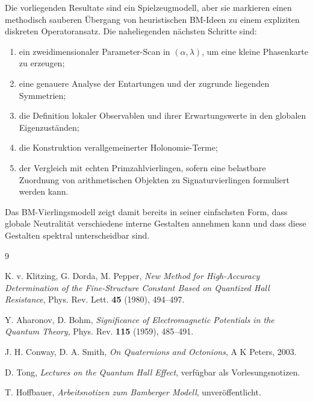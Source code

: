 \documentclass[11pt,a4paper]{article}
\begin{document}
	Die vorliegenden Resultate sind ein Spielzeugmodell, aber sie markieren einen methodisch sauberen Übergang von heuristischen BM-Ideen zu einem expliziten diskreten Operatoransatz. Die naheliegenden nächsten Schritte sind:
	
	\begin{enumerate}[label=(\arabic*)]
		\item ein zweidimensionaler Parameter-Scan in \((\alpha,\lambda)\), um eine kleine Phasenkarte zu erzeugen;
		\item eine genauere Analyse der Entartungen und der zugrunde liegenden Symmetrien;
		\item die Definition lokaler Observablen und ihrer Erwartungswerte in den globalen Eigenzuständen;
		\item die Konstruktion verallgemeinerter Holonomie-Terme;
		\item der Vergleich mit echten Primzahlvierlingen, sofern eine belastbare Zuordnung von arithmetischen Objekten zu Signaturvierlingen formuliert werden kann.
	\end{enumerate}
	
	Das BM-Vierlingsmodell zeigt damit bereits in seiner einfachsten Form, dass globale Neutralität verschiedene interne Gestalten annehmen kann und dass diese Gestalten spektral unterscheidbar sind.
	
	\begin{thebibliography}{9}
		
		K. v. Klitzing, G. Dorda, M. Pepper,
		\textit{New Method for High-Accuracy Determination of the Fine-Structure Constant Based on Quantized Hall Resistance},
		Phys. Rev. Lett. \textbf{45} (1980), 494--497.
		
		Y. Aharonov, D. Bohm,
		\textit{Significance of Electromagnetic Potentials in the Quantum Theory},
		Phys. Rev. \textbf{115} (1959), 485--491.
		
		J. H. Conway, D. A. Smith,
		\textit{On Quaternions and Octonions},
		A K Peters, 2003.
		
		D. Tong,
		\textit{Lectures on the Quantum Hall Effect},
		verfügbar als Vorlesungsnotizen.
		
		T. Hoffbauer,
		\textit{Arbeitsnotizen zum Bamberger Modell},
		unveröffentlicht.
		
	\end{thebibliography}
	
\end{document}
